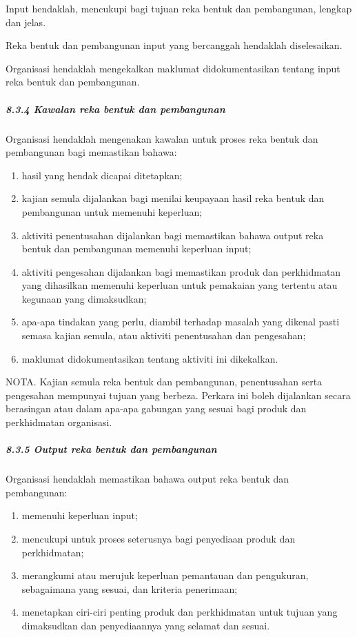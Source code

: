 \documentclass[
]{article}
\begin{document}
Input hendaklah, mencukupi bagi tujuan reka bentuk dan pembangunan,
lengkap dan jelas.

Reka bentuk dan pembangunan input yang bercanggah hendaklah
diselesaikan.

Organisasi hendaklah mengekalkan maklumat didokumentasikan tentang input
reka bentuk dan pembangunan.

\hypertarget{kawalan-reka-bentuk-dan-pembangunan}{%
\subparagraph{8.3.4 Kawalan reka bentuk dan
pembangunan}\label{kawalan-reka-bentuk-dan-pembangunan}}

Organisasi hendaklah mengenakan kawalan untuk proses reka bentuk dan
pembangunan bagi memastikan bahawa:

\begin{enumerate}
\def\labelenumi{\alph{enumi})}
\item
  hasil yang hendak dicapai ditetapkan;
\item
  kajian semula dijalankan bagi menilai keupayaan hasil reka bentuk dan
  pembangunan untuk memenuhi keperluan;
\item
  aktiviti penentusahan dijalankan bagi memastikan bahawa output reka
  bentuk dan pembangunan memenuhi keperluan input;
\item
  aktiviti pengesahan dijalankan bagi memastikan produk dan perkhidmatan
  yang dihasilkan memenuhi keperluan untuk pemakaian yang tertentu atau
  kegunaan yang dimaksudkan;
\item
  apa-apa tindakan yang perlu, diambil terhadap masalah yang dikenal
  pasti semasa kajian semula, atau aktiviti penentusahan dan pengesahan;
\item
  maklumat didokumentasikan tentang aktiviti ini dikekalkan.
\end{enumerate}

NOTA. Kajian semula reka bentuk dan pembangunan, penentusahan serta
pengesahan mempunyai tujuan yang berbeza. Perkara ini boleh dijalankan
secara berasingan atau dalam apa-apa gabungan yang sesuai bagi produk
dan perkhidmatan organisasi.

\hypertarget{output-reka-bentuk-dan-pembangunan}{%
\subparagraph{8.3.5 Output reka bentuk dan
pembangunan}\label{output-reka-bentuk-dan-pembangunan}}

Organisasi hendaklah memastikan bahawa output reka bentuk dan
pembangunan:

\begin{enumerate}
\def\labelenumi{\alph{enumi})}
\item
  memenuhi keperluan input;
\item
  mencukupi untuk proses seterusnya bagi penyediaan produk dan
  perkhidmatan;
\item
  merangkumi atau merujuk keperluan pemantauan dan pengukuran,
  sebagaimana yang sesuai, dan kriteria penerimaan;
\item
  menetapkan ciri-ciri penting produk dan perkhidmatan untuk tujuan yang
  dimaksudkan dan penyediaannya yang selamat dan sesuai.
\end{enumerate}
\end{document}
